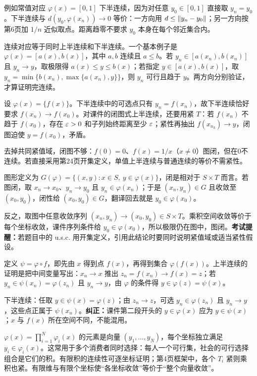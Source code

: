 例如常值对应 $\varphi(x)=[0,1]$ 下半连续，因为对任意 $y_0\in[0,1]$ 直接取 $y_n=y_0$。下半连续与 $d(y_0,\varphi(x_n))\to0$ 等价：一方向用 $d\le\left\lVert y_n-y_0\right\rVert$；另一方向按第6页加 $1/n$ 近似取点。距离趋零不要求 $y_0$ 本身在每个邻近集合内。

连续对应等于同时上半连续和下半连续。一个基本例子是 $\varphi(x)=[a(x),b(x)]$，其中 $a,b$ 连续且 $a\le b$。若 $y_n\in[a(x_n),b(x_n)]$ 且 $y_n\to y$，取极限得 $a(x)\le y\le b(x)$；若指定 $y\in[a(x),b(x)]$，取 $y_n=\min\{b(x_n),\max\{a(x_n),y\}\}$，则 $y_n$ 可行且趋于 $y$。两方向分别验证，才算证明完连续。

设 $\varphi(x)=\{f(x)\}$。下半连续中的可选点只有 $y_n=f(x_n)$，故下半连续恰好要求 $f(x_n)\to f(x_0)$。对课件的闭图式上半连续，还要用紧 $T$：若 $f(x_n)$ 不趋于 $f(x_0)$，存在 $\varepsilon>0$ 和子列始终距离至少 $\varepsilon$；紧性再抽出 $f(x_{n_k})\to y$，闭图迫使 $y=f(x_0)$，矛盾。

去掉共同紧值域，闭图不够：$f(0)=0$、$f(x)=1/x$（$x\ne0$）图闭，但在0不连续。若直接采用第24页开集定义，单值上半连续与普通连续的等价不需紧性。

图形定义为 $G(\varphi)=\{(x,y):x\in S,\ y\in\varphi(x)\}$，闭是相对于 $S\times T$ 而言。若图闭，取 $x_n\to x_0$、$y_n\to y_0$ 且 $y_n\in\varphi(x_n)$；于是 $(x_n,y_n)\in G$ 且收敛至 $(x_0,y_0)$，闭性给 $(x_0,y_0)\in G$，翻译回去就是 $y_0\in\varphi(x_0)$。

反之，取图中任意收敛序列 $(x_n,y_n)\to(x_0,y_0)\in S\times T$。乘积空间收敛等价于每个坐标收敛，课件序列条件给 $y_0\in\varphi(x_0)$，所以极限仍在图中，图闭。\textbf{考试提醒：}若题目中的 u.s.c. 用开集定义，引用此结论时要同时说明紧值域或适当紧性假设。

定义 $\psi=\varphi\circ f$，即先由 $x$ 得到点 $f(x)$，再得到集合 $\varphi(f(x))$。上半连续的证明是把中间变量写出：$x_n\to x$ 推出 $z_n=f(x_n)\to f(x)=z$；若 $y_n\in\psi(x_n)=\varphi(z_n)$ 且 $y_n\to y$，由 $\varphi$ 的条件得 $y\in\varphi(z)=\psi(x)$。

下半连续：任取 $y\in\psi(x)=\varphi(z)$；由 $z_n\to z$，可选 $y_n\in\varphi(z_n)$ 且 $y_n\to y$，这些点正属于 $\psi(x_n)$。\textbf{纠正：}课件第二段开头的 $y\in\varphi(x)$ 应为 $y\in\psi(x)$；$x$ 与 $f(x)$ 所在空间不同，不能混用。

$\varphi(x)=\prod_{i=1}^N\varphi_i(x)$ 的元素是向量 $(y_1,\ldots,y_N)$，每个坐标独立满足 $y_i\in\varphi_i(x)$。这常用于多个消费者同时选择：每人一个可行集，社会的可行选择组合是它们的积。有限积的连续性可逐坐标证明；第4页框架中，各个 $T_i$ 紧则乘积也紧。有限维与有限个坐标使“各坐标收敛”等价于“整个向量收敛”。

